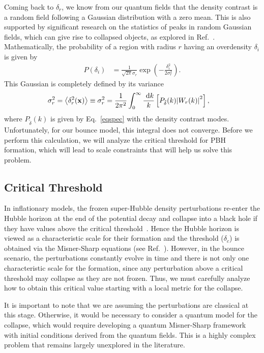 \documentclass[a4paper,11pt]{article}
\renewcommand{\vec}{\mathbf}
\begin{document}
Coming back to $\delta_r$, we know from our quantum fields that the density contrast is
a random field following a Gaussian distribution with a zero mean. This is also
supported by significant research on the statistics of peaks in random Gaussian fields,
which can give rise to collapsed objects, as explored in
Ref.~\cite{Bardeen1986statistics}. Mathematically, the probability of a region with
radius $r$ having an overdensity $\delta_i$ is given by
\begin{align}
	\label{gaussdelta}
	P(\delta_i) & = \frac{1}{\sqrt{2\pi} \sigma_r} \exp(-\frac{\delta^2_i}{2 \sigma_r^2}).
\end{align}
This Gaussian is completely defined by its variance
\begin{align}
	\label{eqsigmar}
	\sigma_r^2 & =\left< \delta_r^2(\vec{x}) \right> \equiv \sigma_r^2 = \frac{1}{2\pi^2} \int_0^\infty \frac{ \mathrm{~d}{k}}{k}\left[ P_{\tilde{\delta}}(k) \abs{W_r(k)}^2\right],
\end{align}
where $P_{\tilde{\delta}}(k)$ is given by Eq.~\eqref{eqspec} with the density contrast
modes. Unfortunately, for our bounce model, this integral does not converge. Before we
perform this calculation, we will analyze the critical threshold for PBH formation,
which will lead to scale constraints that will help us solve this problem.

\subsection{Critical Threshold}

\label{critical_delta}
In inflationary models, the frozen super-Hubble density perturbations re-enter the
Hubble horizon at the end of the potential decay and collapse into a black hole if they
have values above the critical threshold~\cite{Martin2014}. Hence the Hubble horizon is
viewed as a characteristic scale for their formation and the threshold ($\delta_c$) is
obtained via the Misner-Sharp equations (see Ref.~\cite{Musco2019}). However, in the
bounce scenario, the perturbations constantly evolve in time and there is not only one
characteristic scale for the formation, since any perturbation above a critical
threshold may collapse as they are not frozen. Thus, we must carefully analyze how to
obtain this critical value starting with a local metric for the collapse.

	{\color{red} It is important to note that we are assuming the perturbations are
		classical at this stage. Otherwise, it would be necessary to consider a quantum
		model for the collapse, which would require developing a quantum Misner-Sharp
		framework with initial conditions derived from the quantum fields. This is a highly
		complex problem that remains largely unexplored in the literature.}
\end{document}

